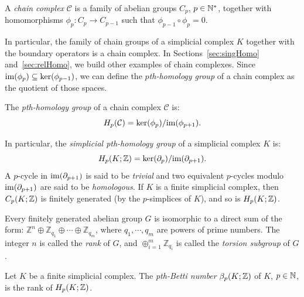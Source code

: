 \begin{defin}
A {\em chain complex} $\mathcal C$ is a family of abelian groups $C_p$, $p\in\mathbb{N}^*$, together with homomorphisms 
$\phi_p:C_p\rightarrow C_{p-1}$ such that $\phi_{p-1}\circ\phi_p=0$.
\end{defin}

In particular, the family of chain groups of a simplicial complex $K$ together with the boundary operators is a chain complex. 
In Sections~\ref{sec:singHomo} and~\ref{sec:relHomo}, we build other examples of chain complexes.
Since $\mathrm{im}(\phi_{p})\subseteq \ker(\phi_{p-1})$,
we can define the \textit{$p$th-homology group} of a chain complex as the quotient of those spaces.

\begin{defin}
The \textit{pth-homology group} of a chain complex $\mathcal C$ is: 
$$H_p(\mathcal C)={\rm ker}(\phi_{p})/\mathrm{im}(\phi_{p+1}).$$ 
\end{defin} 

In particular, the {\em simplicial pth-homology group} of a simplicial complex $K$ is: 
$$H_{p}(K;\mathbb{Z})={\rm ker}(\partial_{p})/\mathrm{im}(\partial_{p+1}).$$ 
A $p$-cycle in $\mathrm{im}(\partial_{p+1})$ is said to be \textit{trivial} and two equivalent $p$-cycles modulo 
$\mathrm{im}(\partial_{p+1})$ are said to be \textit{homologous}. If $K$ is a finite simplicial complex, then
$C_{p}(K;\mathbb{Z})$ is finitely generated (by the $p$-simplices of $K$), and so is $H_p(K;\mathbb{Z})$.

\begin{thm}
\label{th:decomp} 
Every finitely generated abelian group $G$ is isomorphic to a 
direct sum of the form: $\mathbb{Z}^{n}\oplus\mathbb{Z}_{q_{1}}\oplus\cdots\oplus\mathbb{Z}_{q_{m}}$, 
where $q_{1},\cdots, q_{m}$ are powers of prime numbers. The integer $n$ is called the \textit{rank} of $G$, 
and $\oplus_{i=1}^{m}\mathbb{Z}_{q_{i}}$ is called the \textit{torsion subgroup} of $G$.
\end{thm}

\begin{defin} Let $K$ be a finite simplicial complex.
The {\em pth-Betti number} $\beta_{p}(K;\mathbb{Z})$ of $K$, $p\in\mathbb{N}$, is the rank of $H_{p}(K;\mathbb{Z})$.
\end{defin}

 
